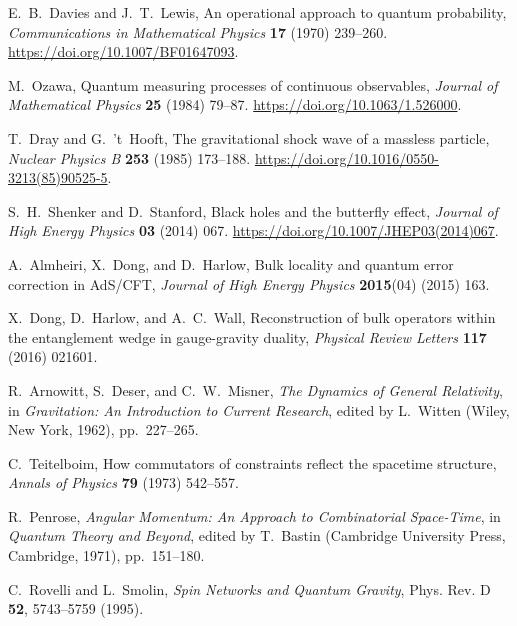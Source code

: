 \documentclass[10pt,twoside,a5paper]{article}
\theoremstyle{definition}
\begin{document}
\begin{eref}
E.~B.~Davies and J.~T.~Lewis, An operational approach to quantum probability,
\emph{Communications in Mathematical Physics} \textbf{17} (1970) 239--260.
\url{https://doi.org/10.1007/BF01647093}.

M.~Ozawa, Quantum measuring processes of continuous observables,
\emph{Journal of Mathematical Physics} \textbf{25} (1984) 79--87.
\url{https://doi.org/10.1063/1.526000}.

T.~Dray and G.~'t~Hooft, The gravitational shock wave of a massless particle,
\emph{Nuclear Physics B} \textbf{253} (1985) 173--188.
\url{https://doi.org/10.1016/0550-3213(85)90525-5}.

S.~H.~Shenker and D.~Stanford, Black holes and the butterfly effect,
\emph{Journal of High Energy Physics} \textbf{03} (2014) 067.
\url{https://doi.org/10.1007/JHEP03(2014)067}.

A.~Almheiri, X.~Dong, and D.~Harlow, Bulk locality and quantum error correction in
AdS/CFT, \emph{Journal of High Energy Physics} \textbf{2015}(04) (2015) 163.

X.~Dong, D.~Harlow, and A.~C.~Wall, Reconstruction of bulk operators within the
entanglement wedge in gauge-gravity duality, \emph{Physical Review Letters}
\textbf{117} (2016) 021601.

R.~Arnowitt, S.~Deser, and C.~W.~Misner,
\emph{The Dynamics of General Relativity},
in \emph{Gravitation: An Introduction to Current Research}, edited by L.~Witten
(Wiley, New York, 1962), pp.~227--265.

C.~Teitelboim,
How commutators of constraints reflect the spacetime structure,
\emph{Annals of Physics} \textbf{79} (1973) 542--557.

R.~Penrose,
\emph{Angular Momentum: An Approach to Combinatorial Space-Time},
in \emph{Quantum Theory and Beyond}, edited by T.~Bastin
(Cambridge University Press, Cambridge, 1971), pp.~151--180.

C.~Rovelli and L.~Smolin,
\emph{Spin Networks and Quantum Gravity},
Phys. Rev. D \textbf{52}, 5743--5759 (1995).


\end{eref}
\end{document}
